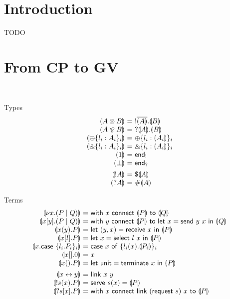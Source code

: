 \documentclass{easychair}
\makeatletter
\newcommand{\ba}{\begin{array}}
\newcommand{\ea}{\end{array}}
\newenvironment{equations}{\[\ba{@{}r@{~}c@{~}l@{}}}{\ea\]}
\newcommand{\key}{\mathsf}
\newcommand{\set}[1]{\{ #1 \}}
\newcommand{\cptogv}[1]{\llparenthesis{#1}\rrparenthesis}
\newcommand{\row}[2]{\set{#1}_{#2}}
\newcommand{\gvOutput}[2]{!{#1}.{#2}}
\newcommand{\gvInput}[2]{?{#1}.{#2}}
\newcommand{\gvEndOutput}{\key{end}_!}
\newcommand{\gvEndInput}{\key{end}_?}
\newcommand{\gvPlus}[2]{\oplus \row{#1}{#2}}
\newcommand{\gvChoice}[2]{\binampersand \row{#1}{#2}}
\newcommand{\gvServer}[1]{\${#1}}
\newcommand{\gvService}[1]{\#{#1}}
\newcommand{\gvDual}[1]{\overline{#1}}
\newcommand{\la}{l}
\newcommand{\A}{A}
\newcommand{\B}{B}
\newcommand{\PR}{P}
\newcommand{\Q}{Q}
\newcommand{\gvUnit}{\key{unit}}
\newcommand{\gvLink}[2]{\key{link}~{#1}~{#2}}
\newcommand{\gvPair}[2]{({#1},{#2})}
\newcommand{\gvLet}[3]{\key{let}~{#1}={#2}~\key{in}~{#3}}
\newcommand{\gvSend}[2]{\key{send}~{#1}~{#2}}
\newcommand{\gvReceive}[1]{\key{receive}~{#1}}
\newcommand{\gvSelect}[2]{\key{select}~{#1}~{#2}}
\newcommand{\gvCase}[2]{\key{case}~{#1}~\key{of}~{#2}}
\newcommand{\gvWith}[3]{\key{with}~{#1}~\key{connect}~{#2}~\key{to}~{#3}}
\newcommand{\gvTerminate}[1]{\key{terminate}~{#1}}
\newcommand{\gvServe}[3]{\key{serve}~{#1}({#2})={#3}}
\newcommand{\gvRequest}[1]{\key{request}~{#1}}
\newcommand{\cpLink}[2]{{#1} \leftrightarrow {#2}}
\newcommand{\cpCut}[3]{\nu {#1}.({#2} \mid {#3})}
\newcommand{\cpOutput}[4]{{#1}[{#2}].({#3} \mid {#4})}
\newcommand{\cpInput}[3]{{#1}({#2}).{#3}}
\newcommand{\cpInject}[3]{{#1}[{#2}].{#3}}
\newcommand{\cpCase}[2]{{#1}.\key{case}~{#2}}
\newcommand{\cpServe}[3]{!{#1}({#2}).{#3}}
\newcommand{\cpRequest}[3]{?{#1}[{#2}].{#3}}
\newcommand{\cpEmptyOut}[1]{{#1}[].0}
\newcommand{\cpEmptyIn}[2]{{#1}().{#2}}
\newcommand{\cpTimes}[2]{{#1} \otimes {#2}}
\newcommand{\cpPar}[2]{{#1} \mathbin{\bindnasrepma} {#2}}
\newcommand{\cpPlus}[2]{\oplus \row{#1}{#2}}
\newcommand{\cpWith}[2]{\binampersand \row{#1}{#2}}
\newcommand{\cpOne}{1}
\newcommand{\cpBottom}{\bot}
\newcommand{\cpOfCourse}[1]{!{#1}}
\newcommand{\cpWhyNot}[1]{?{#1}}
\makeatother
\begin{document}
%
%



\section{Introduction}
TODO

\section{From CP to GV}
~

Types
\begin{equations}
\cptogv{\cpTimes{\A}{\B}} &=& \gvOutput{\gvDual{\cptogv{\A}}}{\cptogv{\B}} \\
\cptogv{\cpPar{\A}{\B}} &=& \gvInput{\cptogv{\A}}{\cptogv{\B}} \\
\cptogv{\cpPlus{\la_i:\A_i}{i}} &=& \gvPlus{\la_i:\cptogv{\A_i}}{i} \\
\cptogv{\cpWith{\la_i:\A_i}{i}} &=& \gvChoice{\la_i:\cptogv{\A_i}}{i} \\
\cptogv{\cpOne} &=& \gvEndOutput \\
\cptogv{\cpBottom} &=& \gvEndInput \\[1ex]

\cptogv{\cpOfCourse{\A}} &=& \gvServer{\cptogv{\A}} \\
\cptogv{\cpWhyNot{\A}} &=& \gvService{\cptogv{\A}} \\
\end{equations}

Terms
\begin{equations}
\cptogv{\cpCut{x}{\PR}{\Q}} &=&
  \gvWith{x}{\cptogv{\PR}}{\cptogv{\Q}} \\
\cptogv{\cpOutput{x}{y}{\PR}{\Q}} &=&
  \gvWith{y}{\cptogv{\PR}}{\gvLet{x}{\gvSend{y}{x}}{\cptogv{\Q}}} \\
\cptogv{\cpInput{x}{y}{\PR}} &=&
  \gvLet{\gvPair{y}{x}}{\gvReceive{x}}{\cptogv{\PR}} \\
\cptogv{\cpInject{x}{\la}{\PR}} &=&
  \gvLet{x}{\gvSelect{\la}{x}}{\cptogv{\PR}} \\  
\cptogv{\cpCase{x}{\row{\la_i.\PR_i}{i}}} &=&
  \gvCase{x}{\row{\la_i(x).\cptogv{\PR_i}}{i}} \\
\cptogv{\cpEmptyOut{x}} &=& x \\
\cptogv{\cpEmptyIn{x}{\PR}} &=&
  \gvLet{\gvUnit}{\gvTerminate{x}}{\cptogv{\PR}} \\[1ex]

\cptogv{\cpLink{x}{y}} &=& \gvLink{x}{y} \\
\cptogv{\cpServe{s}{x}{\PR}} &=&
  \gvServe{s}{x}{\cptogv{\PR}} \\
\cptogv{\cpRequest{s}{x}{\PR}} &=&
  \gvWith{x}{\gvLink{(\gvRequest{s})}{x}}{\cptogv{\PR}} \\
\end{equations}
\end{document}
